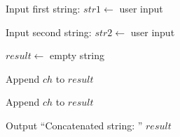 \begin{algorithm}
\caption{Concatenate Two Strings}
\begin{algorithmic}[1]

\STATE Input first string:
\STATE $str1 \gets$ user input

\STATE Input second string:
\STATE $str2 \gets$ user input

\STATE $result \gets$ empty string

    \STATE Append $ch$ to $result$
\ENDFOR

    \STATE Append $ch$ to $result$
\ENDFOR

\STATE Output ``Concatenated string: '' $result$

\end{algorithmic}
\end{algorithm}